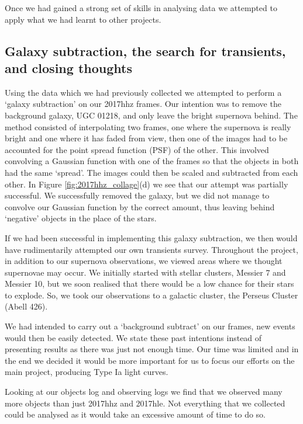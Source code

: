 \documentclass[twocolumn]{revtex4}
\begin{document}
Once we had gained a strong set of skills in analysing data we attempted to apply what we had learnt to other projects. 

\vspace{-3ex}
\subsection{Galaxy subtraction, the search for transients, and closing thoughts}
\vspace{-2ex}

Using the data which we had previously collected we attempted to perform a `galaxy subtraction' on our 2017hhz frames. Our intention was to remove the background galaxy, UGC 01218, and only leave the bright supernova behind. The method consisted of interpolating two frames, one where the supernova is really bright and one where it has faded from view, then one of the images had to be accounted for the point spread function (PSF) of the other. This involved convolving a Gaussian function with one of the frames so that the objects in both had the same `spread'. The images could then be scaled and subtracted from each other. In Figure \ref{fig:2017hhz_collage}(d) we see that our attempt was partially successful. We successfully removed the galaxy, but we did not manage to convolve our Gaussian function by the correct amount, thus leaving behind `negative' objects in the place of the stars. 

If we had been successful in implementing this galaxy subtraction, we then would have rudimentarily attempted our own transients survey. Throughout the project, in addition to our supernova observations, we viewed areas where we thought supernovae may occur. We initially started with stellar clusters, Messier 7 and Messier 10, but we soon realised that there would be a low chance for their stars to explode. So, we took our observations to a galactic cluster, the Perseus Cluster (Abell 426). 

We had intended to carry out a `background subtract' on our frames, new events would then be easily detected. We state these past intentions instead of presenting results as there was just not enough time. Our time was limited and in the end we decided it would be more important for us to focus our efforts on the main project, producing Type Ia light curves. 

Looking at our objects log and observing logs we find that we observed many more objects than just 2017hhz and 2017hle. Not everything that we collected could be analysed as it would take an excessive amount of time to do so. 
\end{document}
